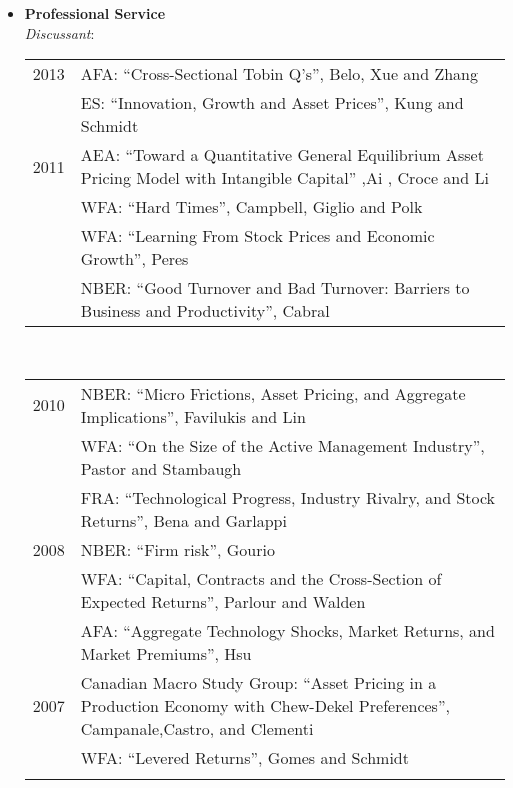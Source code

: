 \documentclass[11pt,letterpaper,overlapped]{res}
\begin{document}
\begin{resume}
\begin{itemize}
\item \textbf{Professional Service} \\

\emph{ Discussant}:\\

\begin{tabular}{lp{12cm}}
 2013 & AFA: ``Cross-Sectional Tobin Q's'', Belo,  Xue and   Zhang\\[0.2cm]
      &  ES: ``Innovation, Growth and Asset Prices'', Kung and Schmidt\\[0.2cm]

  2011 & AEA: ``Toward a Quantitative General Equilibrium Asset Pricing Model with Intangible Capital'' ,Ai , Croce and Li \\[0.2cm]
       & WFA: ``Hard Times'', Campbell, Giglio and Polk\\[0.2cm]
       & WFA: ``Learning From Stock Prices and Economic Growth'', Peres\\[0.2cm]

       & NBER: ``Good Turnover and Bad Turnover: Barriers to Business and Productivity'', Cabral\\[0.2cm]
               \end{tabular}
               \\
\begin{tabular}{lp{12cm}}
  2010 & NBER: ``Micro Frictions, Asset Pricing, and Aggregate Implications'', Favilukis and  Lin \\[0.2cm]
       & WFA: ``On the Size of the Active Management Industry'', Pastor and  Stambaugh\\[0.2cm]
       & FRA: ``Technological Progress, Industry Rivalry, and Stock Returns'', Bena and Garlappi\\[0.2cm]
  2008 & NBER: ``Firm risk'', Gourio \\[0.2cm]
       & WFA: ``Capital, Contracts and the Cross-Section of Expected Returns'', Parlour and Walden\\[0.2cm]
       & AFA: ``Aggregate Technology Shocks, Market Returns, and Market Premiums'', Hsu\\[0.2cm]
  2007 & Canadian Macro Study Group:  ``Asset Pricing in a Production Economy with Chew-Dekel Preferences'', Campanale,Castro, and Clementi         \\[0.2cm]
       & WFA: ``Levered Returns'', Gomes and Schmidt                          \\ \\
  \end{tabular}
  

\end{itemize}
\end{resume}
\end{document}
